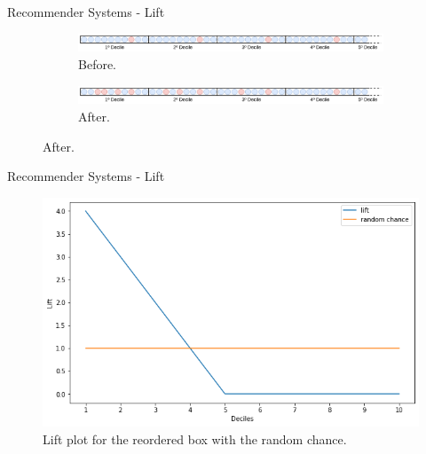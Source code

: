 
\begin{frame}{Recommender Systems - Lift}
    \begin{figure}
        \caption{Reordering of the balls.} \pause
        \begin{subfigure}{\linewidth}
            \centering
            \includegraphics[width=\linewidth]{fig/ch2-rec-box-ordering-before.png}
            \caption{Before.} \pause
        \end{subfigure}
        \begin{subfigure}{\linewidth}
            \centering
            \includegraphics[width=\linewidth]{fig/ch2-rec-box-ordering-after.png}
            \caption{After.}
        \end{subfigure}
    \end{figure}
\end{frame}


\begin{frame}{Recommender Systems - Lift}
    \begin{figure}
       \centering
       \includegraphics[width=\linewidth]{fig/ch2-lift-plot.png}
       \caption{Lift plot for the reordered box with the random chance.}
    \end{figure}
\end{frame}


